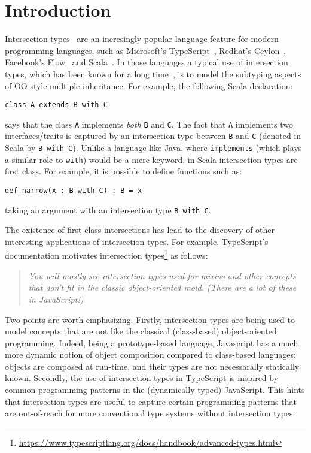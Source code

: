 \section{Introduction}
\label{sec:intro}

Intersection types~\cite{coppo1981functional,Pottinger80type} are an incresingly popular language feature for
modern programming languages, such as Microsoft's TypeScript~\cite{}, 
Redhat's Ceylon~\cite{}, Facebook's Flow~\cite{} and
Scala~\cite{}.
In those languages a typical use of intersection
types, which has been known for a long time~\cite{}, 
is to model the subtyping aspects of OO-style multiple inheritance. 
For example, the following Scala declaration:

\begin{lstlisting}
class A extends B with C
\end{lstlisting}

\noindent says that the class \lstinline{A} implements \emph{both}
\lstinline{B} and \lstinline{C}. The fact that \lstinline{A}
implements two interfaces/traits is captured by an intersection type
between \lstinline{B} and \lstinline{C} (denoted in Scala by
\lstinline{B with C}). Unlike a language like Java, where
\lstinline{implements} (which plays a similar role to
\lstinline{with}) would be a mere keyword, in Scala
intersection types are first class. For example, it is possible to define 
functions such as:

\begin{lstlisting}
def narrow(x : B with C) : B = x
\end{lstlisting}

\noindent taking an argument with an intersection
type \lstinline{B with C}. 

The existence of first-class intersections has lead to the
discovery of other interesting applications of intersection types. 
For example, TypeScript's documentation motivates intersection
types\footnote{\url{https://www.typescriptlang.org/docs/handbook/advanced-types.html}}
as follows:

\begin{quote}
\emph{You will mostly see intersection types used for mixins and other
concepts that don’t fit in the classic object-oriented mold. (There are a lot of these in JavaScript!)}
\end{quote}

\noindent Two points are worth emphasizing. Firstly, 
intersection types are being used to model concepts that are not
like the classical (class-based) object-oriented programming. Indeed, 
being a prototype-based language, Javascript has a much more dynamic 
notion of object composition compared to class-based languages:
objects are composed at run-time, and their types are not necessarally
statically known. Secondly, the use of intersection types in
TypeScript is inspired by common programming patterns in the
(dynamically typed) JavaScript. This hints that intersection types are 
useful to capture certain programming patterns that are out-of-reach for
more conventional type systems without intersection types.

